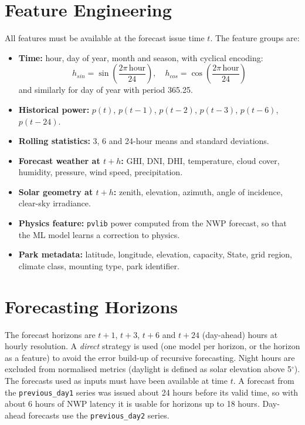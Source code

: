 \documentclass[12pt]{report}
\begin{document}
\section{Feature Engineering}
\vspace{1mm}
All features must be available at the forecast issue time $t$. The feature groups are:
\begin{itemize}[noitemsep]
    \item \textbf{Time:} hour, day of year, month and season, with cyclical encoding:
    \begin{equation}
        h_{sin} = \sin\!\left(\frac{2\pi\,\text{hour}}{24}\right),\quad h_{cos} = \cos\!\left(\frac{2\pi\,\text{hour}}{24}\right)
    \end{equation}
    and similarly for day of year with period 365.25.
    \item \textbf{Historical power:} $p(t)$, $p(t-1)$, $p(t-2)$, $p(t-3)$, $p(t-6)$, $p(t-24)$.
    \item \textbf{Rolling statistics:} 3, 6 and 24-hour means and standard deviations.
    \item \textbf{Forecast weather at $t+h$:} GHI, DNI, DHI, temperature, cloud cover, humidity, pressure, wind speed, precipitation.
    \item \textbf{Solar geometry at $t+h$:} zenith, elevation, azimuth, angle of incidence, clear-sky irradiance.
    \item \textbf{Physics feature:} \texttt{pvlib} power computed from the NWP forecast, so that the ML model learns a correction to physics.
    \item \textbf{Park metadata:} latitude, longitude, elevation, capacity, State, grid region, climate class, mounting type, park identifier.
\end{itemize}

\section{Forecasting Horizons}
\vspace{1mm}
The forecast horizons are $t+1$, $t+3$, $t+6$ and $t+24$ (day-ahead) hours at hourly resolution. A \textit{direct} strategy is used (one model per horizon, or the horizon as a feature) to avoid the error build-up of recursive forecasting. Night hours are excluded from normalised metrics (daylight is defined as solar elevation above 5$^\circ$). The forecasts used as inputs must have been available at time $t$. A forecast from the \texttt{previous\_day1} series was issued about 24 hours before its valid time, so with about 6 hours of NWP latency it is usable for horizons up to 18 hours. Day-ahead forecasts use the \texttt{previous\_day2} series.
\end{document}
